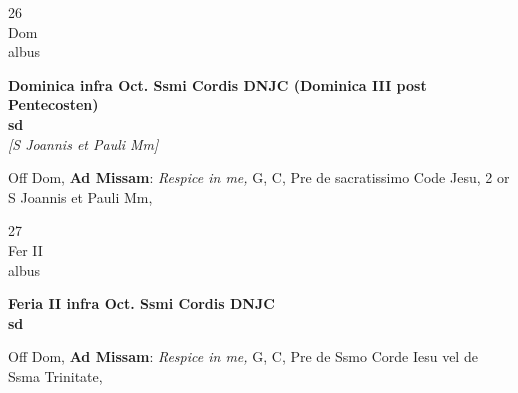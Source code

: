 \documentclass[10pt, openany]{book}
\begin{document}
        \begin{center}
            \begin{minipage}{3.5in}
                \vspace{2em}
                \begin{minipage}{0.5in}
                    {\Huge 26} \\
                    {\normalsize Dom} \\
                    {\normalsize albus}
                \end{minipage}
                \begin{minipage}{3.0in}
                    \textbf{ \large Dominica infra Oct. Ssmi Cordis DNJC (Dominica III post Pentecosten) \\
                    \textnormal{\normalsize sd}} \\ \textit{[S Joannis et Pauli Mm]} \\ 
                \end{minipage}
                \begin{justify}Off Dom, \textbf{Ad Missam}: \textit{Respice in me,} G, C, Pre de sacratissimo Code Jesu, 2 or S Joannis et Pauli Mm,  
                \end{justify}
            \end{minipage}
        \end{center}
    
        \begin{center}
            \begin{minipage}{3.5in}
                \vspace{2em}
                \begin{minipage}{0.5in}
                    {\Huge 27} \\
                    {\normalsize Fer II} \\
                    {\normalsize albus}
                \end{minipage}
                \begin{minipage}{3.0in}
                    \textbf{ \large Feria II infra Oct. Ssmi Cordis DNJC \\
                    \textnormal{\normalsize sd}} \\ 
                \end{minipage}
                \begin{justify}Off Dom, \textbf{Ad Missam}: \textit{Respice in me,} G, C, Pre de Ssmo Corde Iesu vel de Ssma Trinitate,  
                \end{justify}
            \end{minipage}
        \end{center}
    
\end{document}
